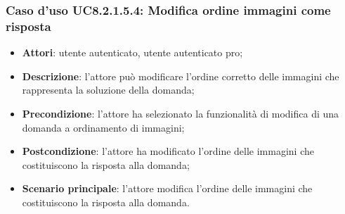 \subsubsection{Caso d'uso UC8.2.1.5.4: Modifica ordine immagini come risposta}
\begin{itemize}
	\item\textbf{Attori}: utente autenticato, utente autenticato pro;
	\item\textbf{Descrizione}: l'attore può modificare l'ordine corretto delle immagini che rappresenta la soluzione della domanda;
	\item\textbf{Precondizione}: l'attore ha selezionato la funzionalità di modifica di una domanda a ordinamento di immagini;
	\item \textbf{Postcondizione}: l'attore ha modificato l'ordine delle immagini che costituiscono la risposta alla domanda;
	\item\textbf{Scenario principale}: l'attore modifica l'ordine delle immagini che costituiscono la risposta alla domanda.
\end{itemize}
